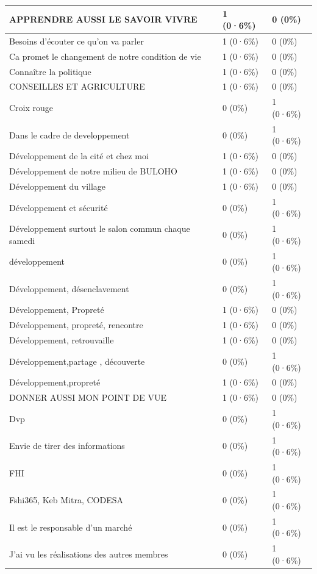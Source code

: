 \documentclass[
]{book}
\begin{document}
\begin{tabular}{l|l|l}
\hline
APPRENDRE AUSSI LE SAVOIR VIVRE & 1 (0·6\%) & 0 (0\%)\\
\hline
Besoins d'écouter ce qu'on va parler & 1 (0·6\%) & 0 (0\%)\\
\hline
Ca promet le changement de notre condition de vie & 1 (0·6\%) & 0 (0\%)\\
\hline
Connaître la politique & 1 (0·6\%) & 0 (0\%)\\
\hline
CONSEILLES ET AGRICULTURE & 1 (0·6\%) & 0 (0\%)\\
\hline
Croix rouge & 0 (0\%) & 1 (0·6\%)\\
\hline
Dans le cadre de developpement & 0 (0\%) & 1 (0·6\%)\\
\hline
Développement de la cité et chez moi & 1 (0·6\%) & 0 (0\%)\\
\hline
Développement de notre milieu de BULOHO & 1 (0·6\%) & 0 (0\%)\\
\hline
Développement du village & 1 (0·6\%) & 0 (0\%)\\
\hline
Développement et sécurité & 0 (0\%) & 1 (0·6\%)\\
\hline
Développement surtout le salon commun chaque samedi & 0 (0\%) & 1 (0·6\%)\\
\hline
développement & 0 (0\%) & 1 (0·6\%)\\
\hline
Développement, désenclavement & 0 (0\%) & 1 (0·6\%)\\
\hline
Développement, Propreté & 1 (0·6\%) & 0 (0\%)\\
\hline
Développement, propreté, rencontre & 1 (0·6\%) & 0 (0\%)\\
\hline
Développement, retrouvaille & 1 (0·6\%) & 0 (0\%)\\
\hline
Développement,partage , découverte & 0 (0\%) & 1 (0·6\%)\\
\hline
Développement,propreté & 1 (0·6\%) & 0 (0\%)\\
\hline
DONNER AUSSI MON POINT DE VUE & 1 (0·6\%) & 0 (0\%)\\
\hline
Dvp & 0 (0\%) & 1 (0·6\%)\\
\hline
Envie de tirer des informations & 0 (0\%) & 1 (0·6\%)\\
\hline
FHI & 0 (0\%) & 1 (0·6\%)\\
\hline
Fshi365, Keb Mitra, CODESA & 0 (0\%) & 1 (0·6\%)\\
\hline
Il est le responsable d'un marché & 0 (0\%) & 1 (0·6\%)\\
\hline
J'ai vu les réalisations des autres membres & 0 (0\%) & 1 (0·6\%)\\

\end{tabular}
\end{document}
